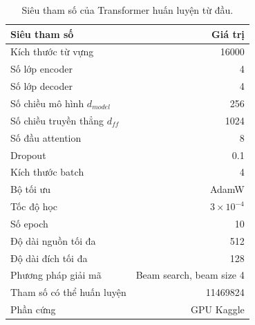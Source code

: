 \documentclass[conference]{IEEEtran}
\begin{document}
\begin{table}[htbp]
\centering
\caption{Siêu tham số của Transformer huấn luyện từ đầu.}
\label{tab:hparams_scratch}
\begin{tabular}{lr}
\toprule
Siêu tham số & Giá trị \\
\midrule
Kích thước từ vựng & 16000 \\
Số lớp encoder & 4 \\
Số lớp decoder & 4 \\
Số chiều mô hình $d_{model}$ & 256 \\
Số chiều truyền thẳng $d_{ff}$ & 1024 \\
Số đầu attention & 8 \\
Dropout & 0.1 \\
Kích thước batch & 4 \\
Bộ tối ưu & AdamW \\
Tốc độ học & $3 \times 10^{-4}$ \\
Số epoch & 10 \\
Độ dài nguồn tối đa & 512 \\
Độ dài đích tối đa & 128 \\
Phương pháp giải mã & Beam search, beam size 4 \\
Tham số có thể huấn luyện & 11469824 \\
Phần cứng & GPU Kaggle \\
\bottomrule
\end{tabular}
\end{table}

\begin{table}[htbp]
\centering
\caption{Siêu tham số tinh chỉnh mô hình tiền huấn luyện.}
\label{tab:hparams_pretrained}
\end{table}
\end{document}
